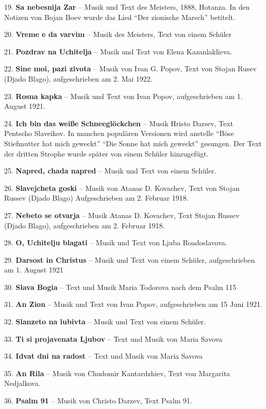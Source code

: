\documentclass[11pt,a5paper,twoside]{article}
\begin{document}
19. \textbf{Sa nebesnija Zar} -- Musik und Text des Meisters, 1888, Hotanza. In den Notizen von Bojan Boev wurde das Lied "`Der zionische Marsch"' betitelt. 

20. \textbf{Vreme e da varvim} -- Musik des Meisters, Text von einem Schüler

21. \textbf{Pozdrav na Uchitelja} -- Musik und Text von Elena Kazanlaklieva.

22. \textbf{Sine moi, pazi zivota} -- Musik von Ivan G. Popov, Text von Stojan Rusev (Djado Blago), aufgeschrieben am 2. Mai 1922.

23. \textbf{Rosna kapka} -- Musik und Text von Ivan Popov, aufgeschrieben am 1. August 1921.

24. \textbf{Ich bin das weiße Schneeglöckchen} -- Musik Hristo Darsev, Text Pentscho Slaveikov. In manchen populären Versionen wird anstelle "`Böse Stiefmutter hat mich geweckt"' "`Die Sonne hat mich geweckt"' gesungen. Der Text der dritten Strophe wurde später von einem Schüler hinzugefügt.

25. \textbf{Napred, chada napred} -- Musik und Text von einem Schüler.

26. \textbf{Slavejcheta goski} -- Musik von Atanas D. Kovachev, Text von Stojan Russev (Djado Blago) Aufgeschrieben am 2. Februar 1918. 

27. \textbf{Nebeto se otvarja} -- Musik Atanas D. Kovachev, Text Stojan Russev (Djado Blago), aufgeschrieben am 2. Februar 1918.

28. \textbf{O, Uchitelju blagati} -- Musik und Text von Ljuba Roadoslavova.

29. \textbf{Darsost in Christus} -- Musik und Text von einem Schüler, aufgeschrieben am 1. August 1921

30. \textbf{Slava Bogia} -- Text und Musik Maria Todorova nach dem Psalm 115

31. \textbf{An Zion} -- Musik und Text von Ivan Popov, aufgeschrieben am 15 Juni 1921.

32. \textbf{Slanzeto na lubivta} -- Musik und Text von einem Schüler.

33. \textbf{Ti si projavenata Ljubov} --   Text und Musik von Maria Savova

34. \textbf{Idvat dni na radost} -- Text und Musik von Maria Savova

35. \textbf{An Rila} -- Musik von Chudomir Kantardzhiev, Text von Margarita Nedjalkova.

36. \textbf{Psalm 91} -- Musik von Christo Darzev, Text Psalm 91.
\end{document}
